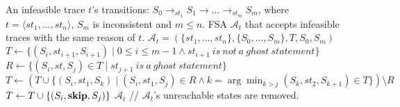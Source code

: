 
\vspace{-0.5cm}

\begin{algorithm}[H]
\caption{$\mathsf{Generalize}(T)$}
	\label{alg:generalize}
	\begin{algorithmic}[1]
		\REQUIRE An infeasible trace $t$'s transitions: $S_0 \rightarrow_{st_1} S_1 \rightarrow ... \rightarrow_{st_m} S_m$, where $t = \langle st_1, ..., st_n\rangle$, $S_m$ is inconsistent and $m \leq n$.
		\ENSURE FSA $\mathcal{A}_t$ that accepts infeasible traces with the same reason of $t$.
		\STATE $\mathcal{A}_t = (\{st_1, ..., st_n\}, \{S_0, ..., S_m\}, T, S_0, S_m)$
		\STATE $T \gets \{(S_i, st_{i+1}, S_{i+1}) \mid 0 \leq i \leq m-1 \wedge st_{i+1}\ is\ not\ a\ ghost\ statement\}$
		\STATE $R \gets \{(S_i, st, S_j) \in T \mid st_{j+1}\ is\ a\ ghost\ statement\}$
		\STATE $T \gets (T \cup \{(S_i, st_1, S_k) \mid (S_i, st_1, S_j) \in R \wedge k = \displaystyle \arg \min_{k > j} (S_k, st_2,S_{k+1} ) \in T\}) \setminus R$
          \STATE $T \gets T \cup \{(S_i,{\bf skip},S_j)\}$
        \ENDIF
    \ENDFOR
    \RETURN $\mathcal{A}_t$ \textcolor{gray!50}{// $\mathcal{A}_t$'s unreachable states are removed.}
	\end{algorithmic}
\end{algorithm}

